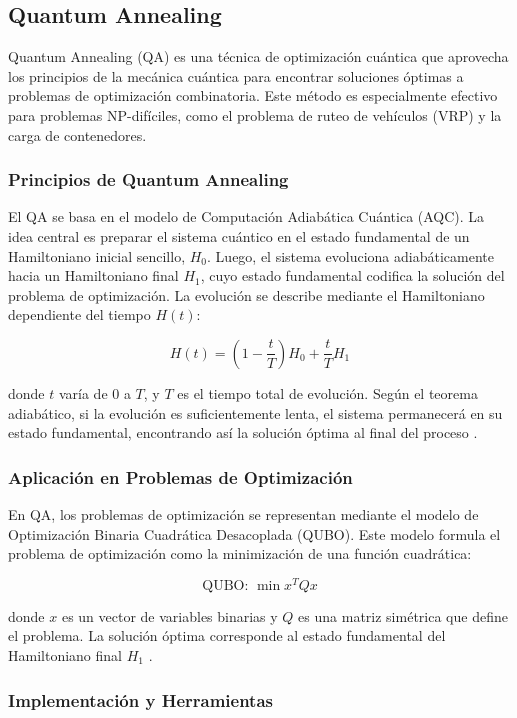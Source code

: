 \documentclass[11pt,a4paper,spanish]{book}
\begin{document}
\begin{itemize}
\subsection{Quantum Annealing}

Quantum Annealing (QA) es una técnica de optimización cuántica que aprovecha los principios de la mecánica cuántica para encontrar soluciones óptimas a problemas de optimización combinatoria. Este método es especialmente efectivo para problemas NP-difíciles, como el problema de ruteo de vehículos (VRP) y la carga de contenedores.

\subsubsection{Principios de Quantum Annealing}

El QA se basa en el modelo de Computación Adiabática Cuántica (AQC). La idea central es preparar el sistema cuántico en el estado fundamental de un Hamiltoniano inicial sencillo, \(H_0\). Luego, el sistema evoluciona adiabáticamente hacia un Hamiltoniano final \(H_1\), cuyo estado fundamental codifica la solución del problema de optimización. La evolución se describe mediante el Hamiltoniano dependiente del tiempo \(H(t)\):

\[ H(t) = (1 - \frac{t}{T}) H_0 + \frac{t}{T} H_1 \]

donde \(t\) varía de 0 a \(T\), y \(T\) es el tiempo total de evolución. Según el teorema adiabático, si la evolución es suficientemente lenta, el sistema permanecerá en su estado fundamental, encontrando así la solución óptima al final del proceso \cite{farhiQuantum}.

\subsubsection{Aplicación en Problemas de Optimización}

En QA, los problemas de optimización se representan mediante el modelo de Optimización Binaria Cuadrática Desacoplada (QUBO). Este modelo formula el problema de optimización como la minimización de una función cuadrática:

\[ \text{QUBO: } \min x^T Q x \]

donde \(x\) es un vector de variables binarias y \(Q\) es una matriz simétrica que define el problema. La solución óptima corresponde al estado fundamental del Hamiltoniano final \(H_1\) \cite{phillipson2024}.

\subsubsection{Implementación y Herramientas}


\end{itemize}
\end{document}
